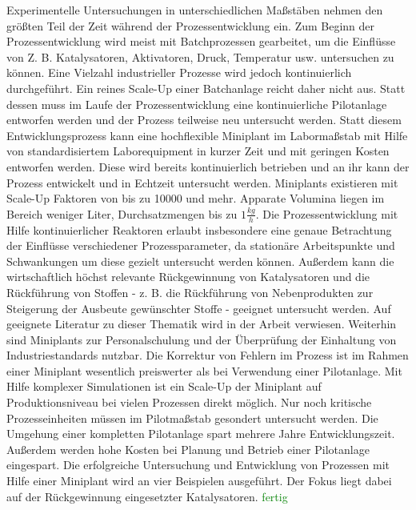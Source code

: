 Experimentelle Untersuchungen in unterschiedlichen Ma\ss{}st\"aben nehmen den gr\"o\ss{}ten Teil der Zeit w\"ahrend der Prozessentwicklung ein. Zum Beginn der Prozessentwicklung wird meist mit Batchprozessen gearbeitet, um die Einfl\"usse von Z. B. Katalysatoren, Aktivatoren, Druck, Temperatur usw. untersuchen zu k\"onnen. Eine Vielzahl industrieller Prozesse wird jedoch kontinuierlich durchgef\"uhrt. Ein reines Scale-Up einer Batchanlage reicht daher nicht aus. Statt dessen muss im Laufe der Prozessentwicklung eine kontinuierliche Pilotanlage entworfen werden und der Prozess teilweise neu untersucht werden. Statt diesem Entwicklungsprozess kann eine hochflexible Miniplant im Laborma\ss{}stab mit Hilfe von standardisiertem Laborequipment in kurzer Zeit und mit geringen Kosten entworfen werden. Diese wird bereits kontinuierlich betrieben und an ihr kann der Prozess entwickelt und in Echtzeit untersucht werden. Miniplants existieren mit Scale-Up Faktoren von bis zu 10000 und mehr. Apparate Volumina liegen im Bereich weniger Liter, Durchsatzmengen bis zu $1 \frac{kg}{h}$. Die Prozessentwicklung mit Hilfe kontinuierlicher Reaktoren erlaubt insbesondere eine genaue Betrachtung der Einfl\"usse verschiedener Prozessparameter, da station\"are Arbeitspunkte und Schwankungen um diese gezielt untersucht werden k\"onnen. Au\ss{}erdem kann die wirtschaftlich h\"ochst relevante R\"uckgewinnung von Katalysatoren und die R\"uckf\"uhrung von Stoffen - z. B. die R\"uckf\"uhrung von Nebenprodukten zur Steigerung der Ausbeute gew\"unschter Stoffe - geeignet untersucht werden. Auf geeignete Literatur zu dieser Thematik wird in der Arbeit verwiesen. Weiterhin sind Miniplants zur Personalschulung und der \"Uberpr\"ufung der Einhaltung von Industriestandards nutzbar. Die Korrektur von Fehlern im Prozess ist im Rahmen einer Miniplant wesentlich preiswerter als bei Verwendung einer Pilotanlage. \cite{Krekel_1985} Mit Hilfe komplexer Simulationen ist ein Scale-Up der Miniplant auf Produktionsniveau bei vielen Prozessen direkt m\"oglich. Nur noch kritische Prozesseinheiten m\"ussen im Pilotma\ss{}stab gesondert untersucht werden. Die Umgehung einer kompletten Pilotanlage spart mehrere Jahre Entwicklungszeit. Au\ss{}erdem werden hohe Kosten bei Planung und Betrieb einer Pilotanlage eingespart. Die erfolgreiche Untersuchung und Entwicklung von Prozessen mit Hilfe einer Miniplant wird an vier Beispielen ausgef\"uhrt. Der Fokus liegt dabei auf der R\"uckgewinnung eingesetzter Katalysatoren. 
\hfill \newline
 \textcolor{green}{fertig}
 
